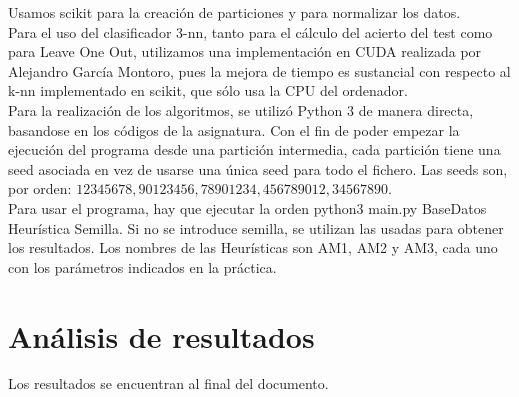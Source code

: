 Usamos scikit para la creación de particiones y para normalizar los datos.\\

Para el uso del clasificador 3-nn, tanto para el cálculo del acierto del test  como para Leave One Out, utilizamos una implementación en CUDA realizada por Alejandro García Montoro, pues la mejora de tiempo es sustancial con respecto al k-nn implementado en scikit, que sólo usa la CPU del ordenador.\\

Para la realización de los algoritmos, se utilizó Python 3 de manera directa, basandose en los códigos de la asignatura. Con el fin de poder empezar la ejecución del programa desde una partición intermedia, cada partición tiene una seed asociada en vez de usarse una única seed para todo el fichero. Las seeds son, por orden: $12345678,90123456,78901234,456789012,34567890$. \\

Para usar el programa, hay que ejecutar la orden  python3 main.py BaseDatos Heurística Semilla. Si no se introduce semilla, se utilizan las usadas para obtener los resultados. Los nombres de las Heurísticas son AM1, AM2 y AM3, cada uno con los parámetros indicados en la práctica.
\newpage
\section{Análisis de resultados}
\begin{table}[]
\centering
\caption{Resumen}
\label{my-label}
\end{table}
Los resultados se encuentran al final del documento.\\

